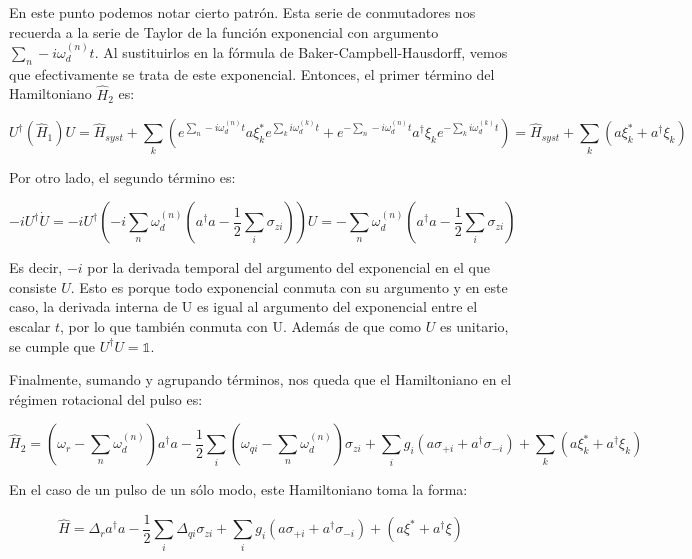 En este punto podemos notar cierto patrón. Esta serie de conmutadores nos recuerda a la serie de Taylor de la función exponencial con argumento $\sum\limits_n-i \omega_d^{(n)} t$. Al sustituirlos en la fórmula de Baker-Campbell-Hausdorff, vemos que efectivamente se trata de este exponencial. Entonces, el primer término del Hamiltoniano $\hat{H}_2$ es:

\begin{equation}
    U^\dagger (\hat{H}_1) U = \hat{H}_{syst} + \sum\limits_k (e^{\sum\limits_n-i \omega_d^{(n)} t} a\xi_k^*e^{\sum\limits_k i\omega_d^{(k)}t}+ e^{-\sum\limits_n-i \omega_d^{(n)} t} a^\dagger\xi_ke^{-\sum\limits_k i\omega_d^{(k)}t}) = \hat{H}_{syst} + \sum\limits_k (a\xi_k^* + a^\dagger\xi_k)
\end{equation}

Por otro lado, el segundo término es:

\begin{equation}
    - i U^\dagger \dot{U} = -i U^\dagger (-i \sum\limits_n \omega_d^{(n)} (a^\dagger a - \frac{1}{2} \sum\limits_i \sigma_{z i})) U = - \sum\limits_n \omega_d^{(n)}(a^\dagger a - \frac{1}{2} \sum\limits_i \sigma_{z i})
\end{equation}

Es decir, $-i$ por la derivada temporal del argumento del exponencial en el que consiste $U$. Esto es porque todo exponencial conmuta con su argumento y en este caso, la derivada interna de U es igual al argumento del exponencial entre el escalar $t$, por lo que también conmuta con U. Además de que como $U$ es unitario, se cumple que $U^\dagger U = \mathds{1}$.

Finalmente, sumando y agrupando términos, nos queda que el Hamiltoniano en el régimen rotacional del pulso es:

\begin{equation}
    \hat{H}_2 = (\omega_r - \sum\limits_n \omega_d^{(n)}) a^\dag a - \frac{1}{2} \sum\limits_i (\omega_{qi} - \sum\limits_n \omega_d^{(n)}) \sigma_{zi} + \sum\limits_i g_i (a \sigma_{+ i} + a^\dagger \sigma_{- i}) + \sum\limits_k (a\xi_k^* + a^\dagger\xi_k)
\end{equation}

En el caso de un pulso de un sólo modo, este Hamiltoniano toma la forma:

\begin{equation}
    \hat{H} = \Delta_r a^\dagger a - \frac{1}{2} \sum\limits_i \Delta_{qi} \sigma_{zi} + \sum\limits_i g_i (a \sigma_{+ i} + a^\dagger \sigma_{- i}) + (a\xi^*+a^\dagger\xi )
\end{equation}

